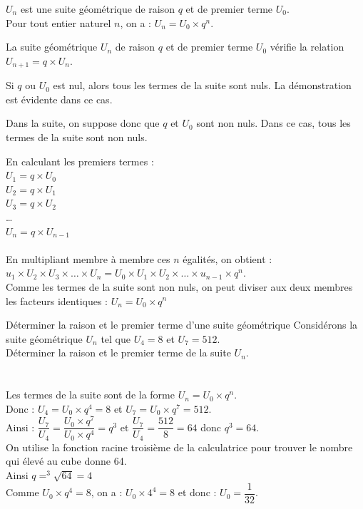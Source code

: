 \begin{propriete}
    $U_n$ est une suite géométrique de raison $q$ et de premier terme $U_0$.\\
    Pour tout entier naturel $n$, on a : $U_n= U_0\times q^n$.
\end{propriete}

\begin{demonstration}
    La suite géométrique $U_n$ de raison $q$ et de premier terme $U_0$ vérifie la relation
    $U_{n+1}=q\times U_n$.
    \begin{itemDem}
    	\item Si $q$ ou $U_0$ est nul, alors tous les termes de la suite sont nuls. La démonstration est évidente dans ce cas.
    	\item Dans la suite, on suppose donc que $q$ et $U_0$ sont non nuls. Dans ce cas, tous les termes de la suite sont non nuls.
    \end{itemDem}
    En calculant les premiers termes :\\ 
    $U_1=q\times U_0$\\
    $U_2=q\times U_1$\\
    $U_3=q\times U_2$\\
    …\\
    $U_n=q\times U_{n-1}$\\
    \\
    En multipliant membre à membre ces $n$ égalités, on obtient :
    $u_1\times U_2\times U_3\times …\times U_n=U_0\times U_1\times U_2\times …\times u_{n-1}\times q^n$.\\
    Comme les termes de la suite sont non nuls, on peut diviser aux deux membres les facteurs identiques : $U_n=U_0\times q^n$
\end{demonstration}

\begin{methodeTitre}{Déterminer la raison et le premier terme d'une suite géométrique}
Considérons la suite géométrique $U_n$ tel que $U_4=8$ et $U_7=512$.\\
Déterminer la raison et le premier terme de la suite $U_n$.\\
\\
\ \\
Les termes de la suite sont de la forme $U_n=U_0\times q^n$.\\
Donc : $U_4=U_0\times q^4=8$ et $U_7=U_0\times q^7=512$.\\
Ainsi : $\dfrac{U_7}{U_4}  = \dfrac{U_0\times q^7}{U_0\times q^4}  =q^3$ et $\dfrac{U_7}{U_4}=\dfrac{512}{8}=64$ donc $q^3=64$.\\
On utilise la fonction racine troisième de la calculatrice pour trouver le nombre qui élevé au cube donne 64.\\
Ainsi $q=^3\sqrt{64}=4$\\
Comme $U_0 \times q^4=8$, on a : $U_0\times 4^4=8$ et donc : $U_0= \dfrac{1}{32}$.
\end{methodeTitre}
